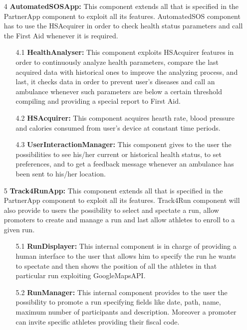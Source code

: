 \begin{enumerate}
\item [4]\textbf{AutomatedSOSApp: }
This component extends all that is specified in the PartnerApp component to exploit all its features. AutomatedSOS component has to use the HSAcquirer in order to check health status parameters and call the First Aid whenever it is required.

	\begin{enumerate}
	\item [4.1]\textbf{HealthAnalyser: }
	This component exploits HSAcquirer features in order to continuously analyze health parameters, compare the last acquired data with historical ones to improve the analyzing process, and last, it checks data in order to prevent user's diseases and call an ambulance whenever such parameters are below a certain threshold compiling and providing a special report to First Aid.
	
	\item [4.2]\textbf{HSAcquirer:}
	This component acquires hearth rate, blood pressure and calories consumed from user's device at constant time periods.
	
	\item [4.3]\textbf{UserInteractionManager:}
	This component gives to the user the possibilities to see his/her current or historical health status, to set preferences, and to get a feedback message whenever an ambulance has been sent to his/her location.
	\end{enumerate}
	

\item [5]\textbf{Track4RunApp: }
This component extends all that is specified in the PartnerApp component to exploit all its features. Track4Run component will also provide to users the possibility to select and spectate a run, allow promoters to create and manage a run and last allow athletes to enroll to a given run.
	
		\begin{enumerate}
	\item [5.1]\textbf{RunDisplayer: }
	 This internal component is in charge of providing a human interface to the user that allows him to specify the run he wants to spectate and then shows the position of all the athletes in that particular run exploiting GoogleMapsAPI.
	
	\item [5.2]\textbf{RunManager: }
	This internal component provides to the user the possibility to promote a run specifying fields like date, path, name, maximum number of participants and description. Moreover a promoter can invite specific athletes providing their fiscal code. 
	\end{enumerate}

\end{enumerate}

